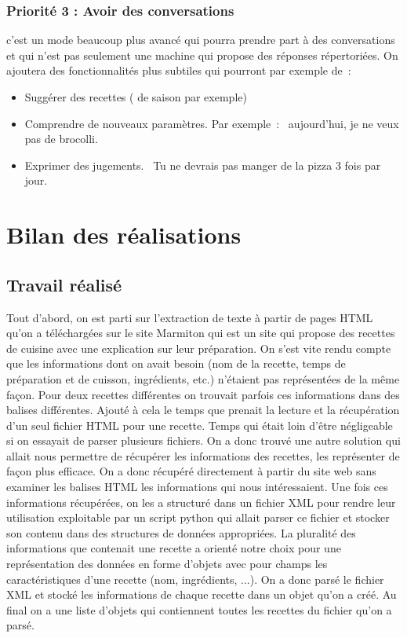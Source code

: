 \documentclass{report}
\begin{document}
\subsubsection{Priorité 3 : Avoir des conversations } c'est un mode beaucoup plus avancé qui pourra prendre part à des conversations et qui n'est pas seulement une machine qui propose des réponses répertoriées. On ajoutera des fonctionnalités plus subtiles qui pourront par exemple de :
\begin{itemize}
\item Suggérer des recettes ( de saison par exemple)
\item Comprendre de nouveaux paramètres. Par exemple : \og aujourd'hui, je ne veux pas de brocolli. \fg{}
\item Exprimer des jugements. \og Tu ne devrais pas manger de la pizza 3 fois par jour.\fg{}
\end{itemize}
\section{Bilan des réalisations}
\subsection{Travail réalisé}

Tout d'abord, on est parti sur l'extraction de texte à partir de pages HTML qu'on a téléchargées sur le site Marmiton qui est un site qui propose des recettes de cuisine avec une explication sur leur préparation. On s'est vite rendu compte que les informations dont on avait besoin (nom de la recette, temps de préparation et de cuisson, ingrédients, etc.) n'étaient pas représentées de la même façon. Pour deux recettes différentes on trouvait parfois ces informations dans des balises différentes. Ajouté à cela le temps que prenait la lecture et la récupération d'un seul fichier HTML pour une recette. Temps qui était loin d'être négligeable si on essayait de parser plusieurs fichiers. On a donc trouvé une autre solution qui allait nous permettre de récupérer les informations des recettes, les représenter de façon plus efficace. On a donc récupéré directement à partir du site web sans examiner les balises HTML les informations qui nous intéressaient. Une fois ces informations récupérées, on les a structuré dans un fichier XML pour rendre leur utilisation exploitable par un script python qui allait parser ce fichier et stocker son contenu dans des structures de données appropriées. La pluralité des informations que contenait une recette a orienté notre choix pour une représentation des données en forme d'objets avec pour champs les caractéristiques d'une recette (nom, ingrédients, ...). On a donc parsé le fichier XML et stocké les informations de chaque recette dans un objet qu'on a créé. Au final on a une liste d'objets qui contiennent toutes les recettes du fichier qu'on a parsé. 
\end{document}
